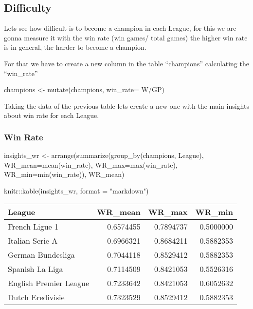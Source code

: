 \documentclass[
]{article}
\newenvironment{Shaded}{\begin{snugshade}}{\end{snugshade}}
\newcommand{\AttributeTok}[1]{\textcolor[rgb]{0.77,0.63,0.00}{#1}}
\newcommand{\FunctionTok}[1]{\textcolor[rgb]{0.00,0.00,0.00}{#1}}
\newcommand{\NormalTok}[1]{#1}
\newcommand{\OtherTok}[1]{\textcolor[rgb]{0.56,0.35,0.01}{#1}}
\newcommand{\SpecialCharTok}[1]{\textcolor[rgb]{0.00,0.00,0.00}{#1}}
\newcommand{\StringTok}[1]{\textcolor[rgb]{0.31,0.60,0.02}{#1}}
\begin{document}
\hypertarget{difficulty}{%
\subsection{Difficulty}\label{difficulty}}

Lets see how difficult is to become a champion in each League, for this
we are gonna measure it with the win rate (win games/ total games) the
higher win rate is in general, the harder to become a champion.

For that we have to create a new column in the table ``champions''
calculating the ``win\_rate''

\begin{Shaded}
\begin{Highlighting}[]
\NormalTok{champions }\OtherTok{\textless{}{-}} \FunctionTok{mutate}\NormalTok{(champions, }\AttributeTok{win\_rate=}\NormalTok{ W}\SpecialCharTok{/}\NormalTok{GP) }
\end{Highlighting}
\end{Shaded}

Taking the data of the previous table lets create a new one with the
main insights about win rate for each League.

\hypertarget{win-rate}{%
\subsubsection{Win Rate}\label{win-rate}}

\begin{Shaded}
\begin{Highlighting}[]
\NormalTok{insights\_wr }\OtherTok{\textless{}{-}} \FunctionTok{arrange}\NormalTok{(}\FunctionTok{summarize}\NormalTok{(}\FunctionTok{group\_by}\NormalTok{(champions, League), }\AttributeTok{WR\_mean=}\FunctionTok{mean}\NormalTok{(win\_rate), }\AttributeTok{WR\_max=}\FunctionTok{max}\NormalTok{(win\_rate), }\AttributeTok{WR\_min=}\FunctionTok{min}\NormalTok{(win\_rate)), WR\_mean)}

\NormalTok{knitr}\SpecialCharTok{::}\FunctionTok{kable}\NormalTok{(insights\_wr, }\AttributeTok{format =} \StringTok{"markdown"}\NormalTok{)}
\end{Highlighting}
\end{Shaded}

\begin{longtable}[]{@{}lrrr@{}}
\toprule()
League & WR\_mean & WR\_max & WR\_min \\
\midrule()
\endhead
French Ligue 1 & 0.6574455 & 0.7894737 & 0.5000000 \\
Italian Serie A & 0.6966321 & 0.8684211 & 0.5882353 \\
German Bundesliga & 0.7044118 & 0.8529412 & 0.5882353 \\
Spanish La Liga & 0.7114509 & 0.8421053 & 0.5526316 \\
English Premier League & 0.7233642 & 0.8421053 & 0.6052632 \\
Dutch Eredivisie & 0.7323529 & 0.8529412 & 0.5882353 \\
\bottomrule()
\end{longtable}
\end{document}
